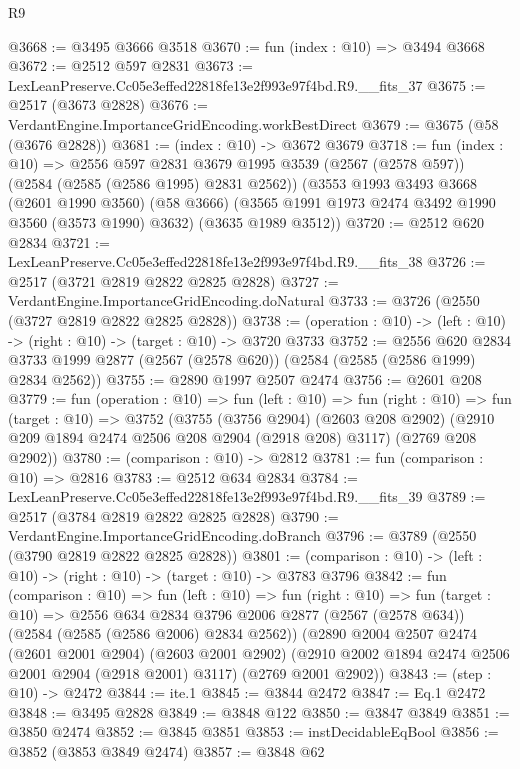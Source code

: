\begin{lexlean}{R9}
\begin{coremodule}
@3668 := @3495 @3666 @3518
@3670 := fun (index : @10) => @3494 @3668
@3672 := @2512 @597 @2831
@3673 := LexLeanPreserve.Cc05e3effed22818fe13e2f993e97f4bd.R9.__fits_37
@3675 := @2517 (@3673 @2828)
@3676 := VerdantEngine.ImportanceGridEncoding.workBestDirect
@3679 := @3675 (@58 (@3676 @2828))
@3681 := (index : @10) -> @3672 @3679
@3718 := fun (index : @10) =>
  @2556
    @597
    @2831
    @3679
    @1995
    @3539
    (@2567 (@2578 @597))
    (@2584 (@2585 (@2586 @1995) @2831 @2562))
    (@3553
      @1993
      @3493
      @3668
      (@2601 @1990 @3560)
      (@58 @3666)
      (@3565 @1991 @1973 @2474 @3492 @1990 @3560 (@3573 @1990) @3632)
      (@3635 @1989 @3512))
@3720 := @2512 @620 @2834
@3721 := LexLeanPreserve.Cc05e3effed22818fe13e2f993e97f4bd.R9.__fits_38
@3726 := @2517 (@3721 @2819 @2822 @2825 @2828)
@3727 := VerdantEngine.ImportanceGridEncoding.doNatural
@3733 := @3726 (@2550 (@3727 @2819 @2822 @2825 @2828))
@3738 := (operation : @10) -> (left : @10) -> (right : @10) -> (target : @10) -> @3720 @3733
@3752 := @2556
    @620
    @2834
    @3733
    @1999
    @2877
    (@2567 (@2578 @620))
    (@2584 (@2585 (@2586 @1999) @2834 @2562))
@3755 := @2890 @1997 @2507 @2474
@3756 := @2601 @208
@3779 := fun (operation : @10) =>
  fun (left : @10) =>
  fun (right : @10) =>
  fun (target : @10) =>
  @3752
    (@3755
      (@3756 @2904)
      (@2603 @208 @2902)
      (@2910 @209 @1894 @2474 @2506 @208 @2904 (@2918 @208) @3117)
      (@2769 @208 @2902))
@3780 := (comparison : @10) -> @2812
@3781 := fun (comparison : @10) => @2816
@3783 := @2512 @634 @2834
@3784 := LexLeanPreserve.Cc05e3effed22818fe13e2f993e97f4bd.R9.__fits_39
@3789 := @2517 (@3784 @2819 @2822 @2825 @2828)
@3790 := VerdantEngine.ImportanceGridEncoding.doBranch
@3796 := @3789 (@2550 (@3790 @2819 @2822 @2825 @2828))
@3801 := (comparison : @10) -> (left : @10) -> (right : @10) -> (target : @10) -> @3783 @3796
@3842 := fun (comparison : @10) =>
  fun (left : @10) =>
  fun (right : @10) =>
  fun (target : @10) =>
  @2556
    @634
    @2834
    @3796
    @2006
    @2877
    (@2567 (@2578 @634))
    (@2584 (@2585 (@2586 @2006) @2834 @2562))
    (@2890
      @2004
      @2507
      @2474
      (@2601 @2001 @2904)
      (@2603 @2001 @2902)
      (@2910 @2002 @1894 @2474 @2506 @2001 @2904 (@2918 @2001) @3117)
      (@2769 @2001 @2902))
@3843 := (step : @10) -> @2472
@3844 := ite.{1}
@3845 := @3844 @2472
@3847 := Eq.{1} @2472
@3848 := @3495 @2828
@3849 := @3848 @122
@3850 := @3847 @3849
@3851 := @3850 @2474
@3852 := @3845 @3851
@3853 := instDecidableEqBool
@3856 := @3852 (@3853 @3849 @2474)
@3857 := @3848 @62

\end{coremodule}
\end{lexlean}
